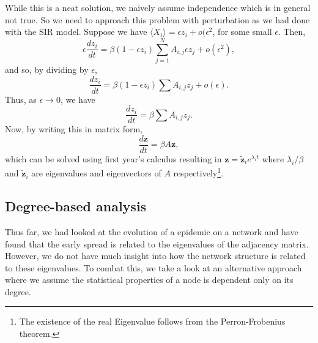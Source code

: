 \documentclass[
]{article}
\theoremstyle{definition}
\theoremstyle{definition}
\begin{document}
While this is a neat solution, we naively assume independence which is
in general not true. So we need to approach this problem with
perturbation as we had done with the SIR model. Suppose we have
\(\langle X_i \rangle = \epsilon z_i + o(\epsilon^2\), for some small
\(\epsilon\). Then,
\[\epsilon \frac{dz_i}{dt} = \beta(1 - \epsilon z_i) 
  \sum_{j = 1}^N A_{i, j}\epsilon z_j + o(\epsilon^2),\] and so, by
dividing by \(\epsilon\),
\[\frac{dz_i}{dt} = \beta(1 - \epsilon z_i) \sum A_{i, j} z_j + o(\epsilon).\]
Thus, as \(\epsilon \to 0\), we have
\[\frac{dz_i}{dt} = \beta \sum A_{i, j} z_j.\] Now, by writing this in
matrix form, \[\frac{d\mathbf{z}}{dt} = \beta A \mathbf{z},\] which can
be solved using first year's calculus resulting in
\(\mathbf{z} = \tilde{\mathbf{z}}_i e^{\lambda_i t}\) where
\(\lambda_i / \beta\) and \(\tilde{\mathbf{z}}_i\) are eigenvalues and
eigenvectors of \(A\)
respectively\footnote{The existence of the real Eigenvalue follows from the 
Perron-Frobenius theorem.}.

\hypertarget{degree-based-analysis}{%
\subsection{Degree-based analysis}\label{degree-based-analysis}}

Thus far, we had looked at the evolution of a epidemic on a network and
have found that the early spread is related to the eigenvalues of the
adjacency matrix. However, we do not have much insight into how the
network structure is related to these eigenvalues. To combat this, we
take a look at an alternative approach where we assume the statistical
properties of a node is dependent only on its degree.
\end{document}
